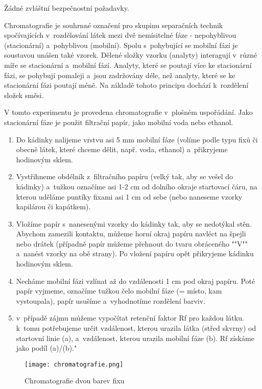 \hspace{-21pt} 

Žádné zvláštní bezpečnostní požadavky.\\

\hspace{-21pt} 

Chromatografie je souhrnné označení pro skupinu separačních technik spočívajících v~rozdělování látek mezi dvě nemísitelné fáze - nepohyblivou (stacionární) a~pohyblivou (mobilní). Spolu s~pohybující se mobilní fází je soustavou unášen také vzorek. Dělené složky vzorku (analyty) interagují v~různé míře se stacionární a~mobilní fází. Analyty, které se poutají více ke stacionární fázi, se pohybují pomaleji a~jsou zadržovány déle, než analyty, které se ke stacionární fázi poutají méně. Na základě tohoto principu dochází k~rozdělení složek směsi.

V tomto experimentu je provedena chromatografie v~plošném uspořádání. Jako stacionární fáze je použit filtrační papír, jako mobilní voda nebo ethanol. \newline

\hspace{-21pt} 

\begin{enumerate}
\item Do kádinky nalijeme vrstvu asi 5 mm mobilní fáze (volíme podle typu fixů či obecně látek, které chceme dělit, např. voda, ethanol) a~přikryjeme hodinovým sklem.
\item Vystřihneme obdélník z~filtračního papíru (velký tak, aby se vešel do kádinky) a~tužkou označíme asi 1-2 cm od dolního okraje startovací čáru, na kterou uděláme puntíky fixami asi 1 cm od sebe (nebo naneseme vzorky kapilárou či kapátkem).
\item Vložíme papír s~nanesenými vzorky do kádinky tak, aby se nedotýkal stěn. Abychom zamezili kontaktu, můžeme horní okraj papíru navléct na špejli nebo drátek (případně papír můžeme přehnout do tvaru obráceného ""V"" a~nanést vzorky na obě strany). Po vložení papíru opět přikryjeme kádinku hodinovým sklem.
\item Necháme mobilní fázi vzlínat až do vzdálenosti 1 cm pod okraj papíru. Poté papír vyjmeme, označíme tužkou čelo mobilní fáze (= místo, kam vystoupala), papír usušíme a~vyhodnotíme rozdělení barviv.
\item v~případě zájmu můžeme vypočítat retenční faktor Rf pro každou látku. k~tomu potřebujeme určit vzdálenost, kterou urazila látka (střed skvrny) od startovní linie (a), a~vzdálenost, kterou urazila mobilní fáze (b). Rf získáme jako podíl (a)/(b)."
\end{enumerate}

\begin{figure}[h]
    \centering
    \texttt{[image: chromatografie.png]}
    \caption{Chromatografie dvou barev fixu}
\end{figure}
